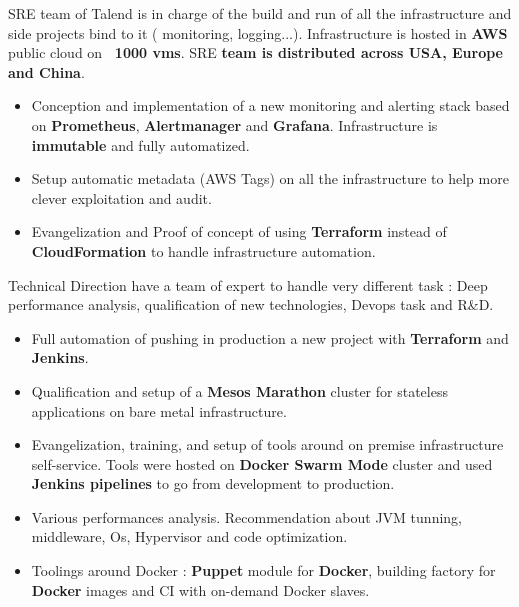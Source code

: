 \documentclass[10pt,a4paper,ragged2e]{altacv}
\begin{document}

		SRE team of Talend is in charge of the build and run of all the infrastructure and side projects bind to it ( monitoring, logging...). Infrastructure is hosted in \textbf{AWS} public cloud on\textbf{ ~1000 vms}. SRE \textbf{team is distributed across USA, Europe and China}.
	
		\medskip
		\begin{itemize}
			\item Conception and implementation of a new monitoring and alerting stack based on \textbf{Prometheus}, \textbf{Alertmanager} and \textbf{Grafana}. Infrastructure is \textbf{immutable} and fully automatized.
			\item Setup automatic metadata (AWS Tags) on all the infrastructure to help more clever exploitation and audit.
			\item Evangelization and Proof of concept of using \textbf{Terraform} instead of \textbf{CloudFormation} to handle infrastructure automation.
		\end{itemize}
	\divider

	
		Technical Direction have a team of expert to handle very different task : Deep performance analysis, qualification of new technologies, Devops task and R\&D.
		
		\medskip
		\begin{itemize}
			\item Full automation of pushing in production a new project with \textbf{Terraform} and \textbf{Jenkins}.
			\item Qualification and setup of a\textbf{ Mesos Marathon} cluster for stateless applications on bare metal infrastructure.
			\item Evangelization, training, and setup of tools around on premise infrastructure self-service. Tools were hosted on \textbf{Docker Swarm Mode} cluster and used \textbf{Jenkins pipelines} to go from development to production.
			\item Various performances analysis. Recommendation about JVM tunning, middleware, Os, Hypervisor and code optimization.
			\item Toolings around Docker : \textbf{Puppet} module for \textbf{Docker}, building factory for \textbf{Docker} images and CI with on-demand Docker slaves.
			
		\end{itemize}
	\divider
\end{document}
